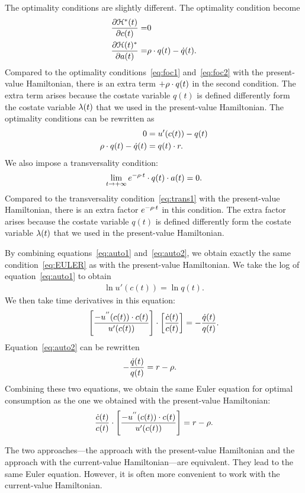 \documentclass[letterpaper,12pt,leqno]{article}
\begin{document}
The optimality conditions are slightly different. The optimality condition become
\begin{align*}
\frac{\partial \mathcal{H}^{*}(t)}{\partial c(t)}=& 0\\
\frac{\partial \mathcal{H}(t)^{*}}{\partial a(t)}=&\rho\cdot q(t)-\dot{q}(t).
\end{align*}
Compared to the optimality conditions~\eqref{eq:foc1} and~\eqref{eq:foc2} with the present-value Hamiltonian, there is an extra term $+\rho\cdot q(t)$ in the second condition. The extra term arises because the costate variable $q(t)$ is defined differently form the costate variable $\lambda(t)$ that we used in the present-value Hamiltonian. The optimality conditions can be rewritten as
\begin{align}
0 &= u'(c(t)) -q(t)\label{eq:auto1}\\
\rho\cdot q(t)-\dot{q}(t)&= q(t)\cdot  r .\label{eq:auto2}
\end{align}
We also impose a transversality condition:
\[\lim_{t\to+\infty}e^{-\rho \cdot t} \cdot  q(t)\cdot a(t)=0.\]
Compared to the transversality condition~\eqref{eq:trans1} with the present-value Hamiltonian, there is an extra factor $e^{-\rho \cdot t}$ in this condition. The extra factor arises because the costate variable $q(t)$ is defined differently form the costate variable $\lambda(t)$ that we used in the present-value Hamiltonian.

By combining equations~\eqref{eq:auto1} and~\eqref{eq:auto2}, we obtain exactly the same condition~\eqref{eq:EULER} as with the present-value Hamiltonian. We take the log of equation~\eqref{eq:auto1} to obtain
\begin{align*}
\ln{u'(c(t))} = \ln{q(t)}.
\end{align*}
We then take time derivatives in this equation:
\begin{equation*}
\left[  \frac{-u^{''}(c(t)) \cdot c(t)}{u'(c(t))} \right]\cdot \left[ \frac{\dot{c}(t)}{c(t)} \right] =-\frac{\dot{q}(t)}{q(t)}.
\end{equation*}
Equation~\eqref{eq:auto2} can be rewritten
\begin{align*}
-\frac{\dot{q}(t)}{q(t)}&= r-\rho.
\end{align*}
Combining these two equations, we obtain the same Euler equation for optimal consumption as the one we obtained with the present-value Hamiltonian:
\begin{equation*}
\frac{\dot{c}(t)}{c(t)}\cdot \left[ \frac{-u^{''}(c(t)) \cdot c(t)}{u'(c(t)) } \right] =r-\rho.
\end{equation*}

The two approaches---the approach with the present-value Hamiltonian and the approach with the current-value Hamiltonian---are equivalent. They lead to the same Euler equation. However, it is often more convenient to work with the current-value Hamiltonian.
\end{document}
